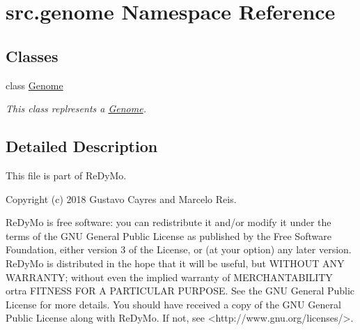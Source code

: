 \hypertarget{namespacesrc_1_1genome}{}\section{src.\+genome Namespace Reference}
\label{namespacesrc_1_1genome}
\subsection*{Classes}
\begin{DoxyCompactItemize}
\item 
class \mbox{\hyperlink{classsrc_1_1genome_1_1Genome}{Genome}}
\begin{DoxyCompactList}\small\item\em This class replresents a \mbox{\hyperlink{classsrc_1_1genome_1_1Genome}{Genome}}. \end{DoxyCompactList}\end{DoxyCompactItemize}


\subsection{Detailed Description}
\begin{DoxyVerb}This file is part of ReDyMo.

Copyright (c) 2018  Gustavo Cayres and Marcelo Reis.

ReDyMo is free software: you can redistribute it and/or modify it
under the terms of the GNU General Public License as published by the
Free Software Foundation, either version 3 of the License, or (at your
option) any later version.
ReDyMo is distributed in the hope that it will be useful, but WITHOUT
ANY WARRANTY; without even the implied warranty of MERCHANTABILITY ortra
FITNESS FOR A PARTICULAR PURPOSE. See the GNU General Public License
for more details.
You should have received a copy of the GNU General Public License along
with ReDyMo. If not, see <http://www.gnu.org/licenses/>.
\end{DoxyVerb}
 
